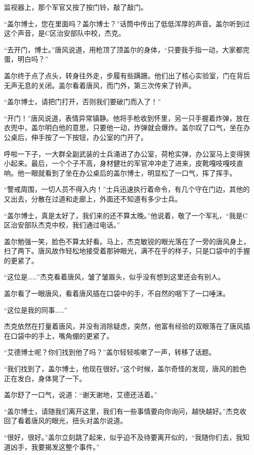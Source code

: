 监视器上，那个军官又按了按门铃，敲了敲门。

“盖尔博士，您在里面吗？盖尔博士？”话筒中传出了低低浑厚的声音。盖尔听到过这个声音，是C区治安部队中校，杰克。

“去开门，博士。”唐风说道，用枪顶了顶盖尔的身体，“只要我手指一动，大家都完蛋，明白吗？”

盖尔终于点了点头，转身往外走，步履有些蹒跚。他们出了核心实验室，门在背后无声无息的关闭。盖尔看着唐风，而门外，第三次传来了铃声。

“盖尔博士，请把门打开，否则我们要破门而入了！”

“开门！”唐风说道，表情异常镇静。他将手枪收到怀里，另一只手握着炸弹，放在衣兜中，盖尔明白他的意思，只要他一动，炸弹就会爆炸。盖尔叹了口气，坐在办公桌后，伸手按了一下按钮，办公室的门开了。

呼啦一下子，一大群全副武装的士兵涌进了办公室，荷枪实弹，办公室马上变得狭小起来。最后，一个个子不高，身材健壮的军官冲冲走了进来，皮靴嘎吱嘎吱直响。他一眼就看到了坐在办公桌后的盖尔博士，明显松了一口气，挥了挥手。

“警戒周围，一切人员不得入内！”士兵迅速执行着命令，有几个守在门边，其他的又出去，分散在过道和走廊上，外面还不知道有多少士兵。

“盖尔博士，真是太好了，我们来的还不算太晚。”他说着，敬了一个军礼，“我是C区治安部队杰克中校，我们通过电话。”

盖尔勉强一笑，脸色不算太好看。马上，杰克敏锐的眼光落在了一旁的唐风身上，扫了两下。唐风故作轻松地接受着那钟眼光，满不在乎的样子，只是口袋中的手握的更紧了。

“这位是……”杰克看着唐风，皱了皱眉头，似乎没有想到这里还会有别人。

盖尔看了一眼唐风，看着唐风插在口袋中的手，不自然的咽下了一口唾沫。

“这位是我的同事……”

杰克依然在打量着唐风，并没有消除疑虑，突然，他富有经验的双眼落在了唐风插在口袋中的手上，嘴角绷的更紧了。

“艾德博士呢？你们找到他了吗？”盖尔轻轻咳嗽了一声，转移了话题。

“我们找到了，盖尔博士，他现在很好。”这个时候，盖尔奇怪的发现，唐风的脸色正在发白，身体晃了一下。

盖尔舒了一口气，说道：“谢天谢地，艾德还活着。”

“盖尔博士，请随我们离开这里，我们有一些事情要向你询问，越快越好。”杰克收回了看着唐风的眼光，扭头对盖尔说道。

“很好，很好。”盖尔立刻跳了起来，似乎迫不及待要离开似的，“我随你们去，我知道凶手，我要揭发这整个事件。”

